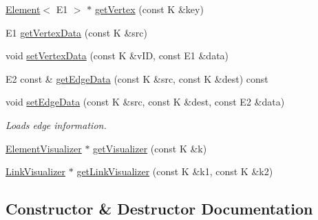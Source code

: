 \begin{DoxyCompactItemize}
\item 
\hyperlink{classbridges_1_1datastructure_1_1_element}{Element}$<$ E1 $>$ $\ast$ \hyperlink{classbridges_1_1datastructure_1_1_graph_adj_matrix_a4100f224c05a77dd2c362c05fa15e6a2}{get\+Vertex} (const K \&key)
\item 
E1 \hyperlink{classbridges_1_1datastructure_1_1_graph_adj_matrix_a0be12527de2ab43b9de9b7ccd6e94d94}{get\+Vertex\+Data} (const K \&src)
\item 
void \hyperlink{classbridges_1_1datastructure_1_1_graph_adj_matrix_a8fb501cd1b1953c85e2aa3963f8ecd1f}{set\+Vertex\+Data} (const K \&v\+ID, const E1 \&data)
\item 
E2 const  \& \hyperlink{classbridges_1_1datastructure_1_1_graph_adj_matrix_ab6cd22b1a8f1e9f1c0865ba7aec6c6ca}{get\+Edge\+Data} (const K \&src, const K \&dest) const
\item 
void \hyperlink{classbridges_1_1datastructure_1_1_graph_adj_matrix_a9367d6bee5ce194bad2c8ca105d5be2f}{set\+Edge\+Data} (const K \&src, const K \&dest, const E2 \&data)
\begin{DoxyCompactList}\small\item\em Loads edge information. \end{DoxyCompactList}\item 
\hyperlink{classbridges_1_1datastructure_1_1_element_visualizer}{Element\+Visualizer} $\ast$ \hyperlink{classbridges_1_1datastructure_1_1_graph_adj_matrix_ad17ebd77b7fd42bd440aa5bbf313c752}{get\+Visualizer} (const K \&k)
\item 
\hyperlink{classbridges_1_1datastructure_1_1_link_visualizer}{Link\+Visualizer} $\ast$ \hyperlink{classbridges_1_1datastructure_1_1_graph_adj_matrix_ab41a062af77b11e5cc034f7c21d12421}{get\+Link\+Visualizer} (const K \&k1, const K \&k2)
\end{DoxyCompactItemize}


\subsection{Constructor \& Destructor Documentation}
\mbox{\label{classbridges_1_1datastructure_1_1_graph_adj_matrix_ad4715c14dccce7f40fb91f8d31c9e55b}} 
